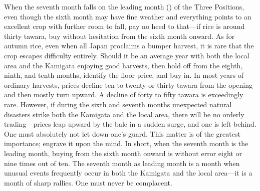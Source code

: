 \begin{sokyubox}
{\small\itshape\color{sokyubar} }

\medskip
When the seventh month falls on the leading month ()
of the Three Positions, even though the sixth month may have fine weather
and everything points to an excellent crop with further room to fall,
pay no heed to that---if rice is around thirty tawara, buy without
hesitation from the sixth month onward. As for autumn rice, even when
all Japan proclaims a bumper harvest, it is rare that the crop escapes
difficulty entirely. Should it be an average year with both the local
area and the Kamigata enjoying good harvests, then hold off from the
eighth, ninth, and tenth months, identify the floor price, and buy in.
In most years of ordinary harvests, prices decline ten to twenty or
thirty tawara from the opening and then mostly turn upward. A decline of
forty to fifty tawara is exceedingly rare. However, if during the sixth
and seventh months unexpected natural disasters strike both the Kamigata
and the local area, there will be no orderly trading---prices leap
upward by the bale in a sudden surge, and one is left behind. One must
absolutely not let down one's guard. This matter is of the greatest
importance; engrave it upon the mind. In short, when the seventh month
is the leading month, buying from the sixth month onward is without
error eight or nine times out of ten. The seventh month as leading month
is a month when unusual events frequently occur in both the Kamigata
and the local area---it is a month of sharp rallies. One must never be
complacent.
\end{sokyubox}

